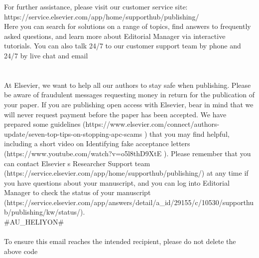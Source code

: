 {For further assistance, please visit our customer service site: https://service.elsevier.com/app/home/supporthub/publishing/\\
Here you can search for solutions on a range of topics, find answers to frequently asked questions, and learn more about Editorial Manager via interactive tutorials. You can also talk 24/7 to our customer support team by phone and 24/7 by live chat and email\\
\\
\\
At Elsevier, we want to help all our authors to stay safe when publishing. Please be aware of fraudulent messages requesting money in return for the publication of your paper. If you are publishing open access with Elsevier, bear in mind that we will never request payment before the paper has been accepted. We have prepared some guidelines (https://www.elsevier.com/connect/authors-update/seven-top-tips-on-stopping-apc-scams ) that you may find helpful, including a short video on Identifying fake acceptance letters (https://www.youtube.com/watch?v=o5l8thD9XtE ). Please remember that you can contact Elsevier s Researcher Support team (https://service.elsevier.com/app/home/supporthub/publishing/) at any time if you have questions about your manuscript, and you can log into Editorial Manager to check the status of your manuscript (https://service.elsevier.com/app/answers/detail/a\_id/29155/c/10530/supporthub/publishing/kw/status/).\\
\#AU\_HELIYON\#\\
\\
To ensure this email reaches the intended recipient, please do not delete the above code\\
}